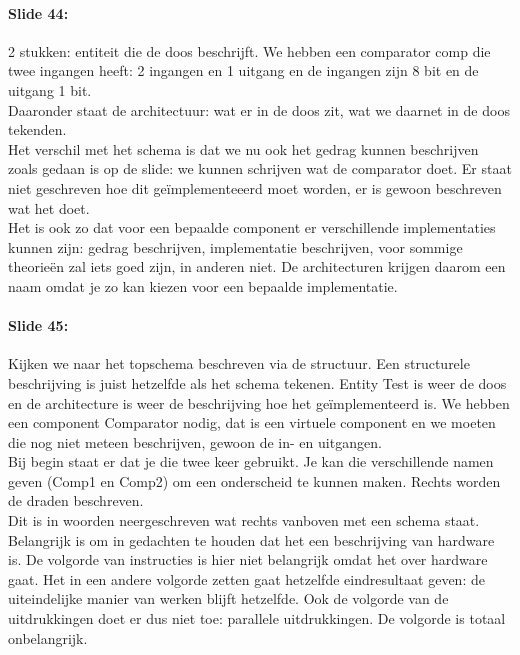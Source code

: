 \documentclass[10pt,a4paper]{book}
\begin{document}
\paragraph{Slide 44:} 2 stukken: entiteit die de doos beschrijft. We hebben een comparator comp die twee ingangen heeft: 2 ingangen en 1 uitgang en de ingangen zijn 8 bit en de uitgang 1 bit.\\
Daaronder staat de architectuur: wat er in de doos zit, wat we daarnet in de doos tekenden.\\
Het verschil met het schema is dat we nu ook het gedrag kunnen beschrijven zoals gedaan is op de slide: we kunnen schrijven wat de comparator doet. Er staat niet geschreven hoe dit ge\"implementeeerd moet worden, er is gewoon beschreven wat het doet. \\
Het is ook zo dat voor een bepaalde component er verschillende implementaties kunnen zijn: gedrag beschrijven, implementatie beschrijven, voor sommige theorie\"en zal iets goed zijn, in anderen niet. De architecturen krijgen daarom een naam omdat je zo kan kiezen voor een bepaalde implementatie.

\paragraph{Slide 45:} Kijken we naar het topschema beschreven via de structuur. Een structurele beschrijving is juist hetzelfde als het schema tekenen. Entity Test is weer de doos en de architecture is weer de beschrijving hoe het ge\"implementeerd is. We hebben een component Comparator nodig, dat is een virtuele component en we moeten die nog niet meteen beschrijven, gewoon de in- en uitgangen.\\
Bij begin staat er dat je die twee keer gebruikt. Je kan die verschillende namen geven (Comp1 en Comp2) om een onderscheid te kunnen maken. Rechts worden de draden beschreven. \\
Dit is in woorden neergeschreven wat rechts vanboven met een schema staat. \\
Belangrijk is om in gedachten te houden dat het een beschrijving van hardware is. De volgorde van instructies is hier niet belangrijk omdat het over hardware gaat. Het in een andere volgorde zetten gaat hetzelfde eindresultaat geven: de uiteindelijke manier van werken blijft hetzelfde. Ook de volgorde van de uitdrukkingen doet er dus niet toe: parallele uitdrukkingen. De volgorde is totaal onbelangrijk.
\end{document}
